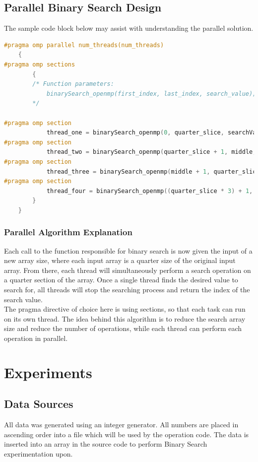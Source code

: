 \documentclass[fleqn,10pt]{wlscirep}
\begin{document}
\pagebreak


\subsection*{Parallel Binary Search Design}
The sample code block below may assist with understanding the parallel solution.

\begin{lstlisting}[language=C, caption=OpenMP Binary Search]
#pragma omp parallel num_threads(num_threads)
    {
#pragma omp sections
        {
        /* Function parameters:
            binarySearch_openmp(first_index, last_index, search_value);
        */

#pragma omp section
            thread_one = binarySearch_openmp(0, quarter_slice, searchVal);
#pragma omp section
            thread_two = binarySearch_openmp(quarter_slice + 1, middle, searchVal);
#pragma omp section
            thread_three = binarySearch_openmp(middle + 1, quarter_slice * 3, searchVal);
#pragma omp section
            thread_four = binarySearch_openmp((quarter_slice * 3) + 1, last, searchVal);
        }
    }
\end{lstlisting}

\subsubsection*{Parallel Algorithm Explanation}
Each call to the function responsible for binary search is now given the input of a new array size, where each input array is a quarter size of the original input array. From there, each thread will simultaneously perform a search operation on a quarter section of the array. Once a single thread finds the desired value to search for, all threads will stop the searching process and return the index of the search value. 
\\
The pragma directive of choice here is using sections, so that each task can run on its own thread. The idea behind this algorithm is to reduce the search array size and reduce the number of operations, while each thread can perform each operation in parallel. 

\pagebreak
\section{Experiments}
\subsection*{Data Sources}
All data was generated using an integer generator. All numbers are placed in ascending order into a file which will be used by the operation code. The data is inserted into an array in the source code to perform Binary Search experimentation upon.
\end{document}
